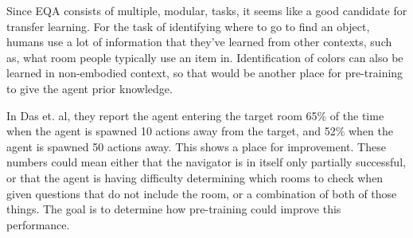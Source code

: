 \documentclass{article}
\begin{document}
Since EQA consists of multiple, modular, tasks, it seems like a good candidate for transfer learning. For the task of identifying where to go to find an object, humans use a lot of information that they've learned from other contexts, such as, what room people typically use an item in. Identification of colors can also be learned in non-embodied context, so that would be another place for pre-training to give the agent prior knowledge. 

In Das et. al, they report the agent entering the target room 65\% of the time when the agent is spawned 10 actions away from the target, and 52\% when the agent is spawned 50 actions away\cite{embodiedqa}. This shows a place for improvement. These numbers could mean either that the navigator is in itself only partially successful, or that the agent is having difficulty determining which rooms to check when given questions that do not include the room, or a combination of both of those things. The goal is to determine how pre-training could improve this performance. 


\end{document}
